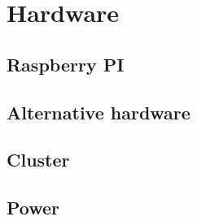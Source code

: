 


\section{Hardware}
\subsection{Raspberry PI}
\subsection{Alternative hardware}
\subsection{Cluster}
\subsection{Power}
